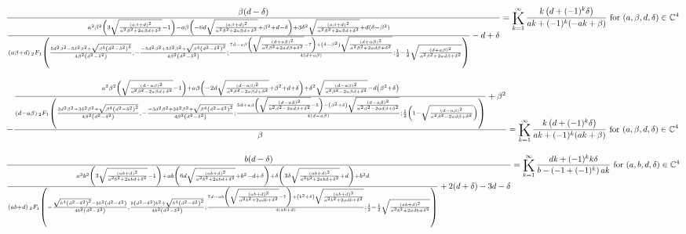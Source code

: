 \documentclass{article}
\newcommand{\bigK}{\mathop{\raisebox{-5pt}{\huge K}}}
\begin{document}
\[\frac{\beta  (d-\delta )}{\frac{a^2 \beta ^2 \left(3 \sqrt{\frac{(a \beta +d)^2}{a^2 \beta ^2+2 a \beta  d+\delta ^2}}-1\right)-a \beta  \left(-6 d \sqrt{\frac{(a \beta +d)^2}{a^2 \beta ^2+2 a \beta  d+\delta ^2}}+\beta ^2+d-\delta \right)+3 \delta ^2 \sqrt{\frac{(a \beta +d)^2}{a^2 \beta ^2+2 a \beta  d+\delta ^2}}+d \left(\delta -\beta ^2\right)}{(a \beta +d) \, _2F_1\left(\frac{5 d^2 \beta ^2-5 \delta ^2 \beta ^2+\sqrt{\beta ^4 \left(d^2-\delta ^2\right)^2}}{4 \beta ^2 \left(d^2-\delta ^2\right)},-\frac{-5 d^2 \beta ^2+5 \delta ^2 \beta ^2+\sqrt{\beta ^4 \left(d^2-\delta ^2\right)^2}}{4 \beta ^2 \left(d^2-\delta ^2\right)};\frac{7 d-a \beta  \left(\sqrt{\frac{(d+a \beta )^2}{a^2 \beta ^2+2 a d \beta +\delta ^2}}-7\right)+\left(\delta -\beta ^2\right) \sqrt{\frac{(d+a \beta )^2}{a^2 \beta ^2+2 a d \beta +\delta ^2}}}{4 (d+a \beta )};\frac{1}{2}-\frac{1}{2} \sqrt{\frac{(d+a \beta )^2}{a^2 \beta ^2+2 a d \beta +\delta ^2}}\right)}-d+\delta }=\bigK_{k=1}^{\infty}\frac{k \left(d+(-1)^k \delta \right)}{a k+(-1)^k (-a k+\beta )}\text{ for }(a,\beta ,d,\delta )\in \mathbb{C}^4\] 

\[-\frac{\frac{a^2 \beta ^2 \left(\sqrt{\frac{(d-a \beta )^2}{a^2 \beta ^2-2 a \beta  d+\delta ^2}}-1\right)+a \beta  \left(-2 d \sqrt{\frac{(d-a \beta )^2}{a^2 \beta ^2-2 a \beta  d+\delta ^2}}+\beta ^2+d+\delta \right)+\delta ^2 \sqrt{\frac{(d-a \beta )^2}{a^2 \beta ^2-2 a \beta  d+\delta ^2}}-d \left(\beta ^2+\delta \right)}{(d-a \beta ) \, _2F_1\left(\frac{3 d^2 \beta ^2-3 \delta ^2 \beta ^2+\sqrt{\beta ^4 \left(d^2-\delta ^2\right)^2}}{4 \beta ^2 \left(d^2-\delta ^2\right)},-\frac{-3 d^2 \beta ^2+3 \delta ^2 \beta ^2+\sqrt{\beta ^4 \left(d^2-\delta ^2\right)^2}}{4 \beta ^2 \left(d^2-\delta ^2\right)};\frac{5 d+a \beta  \left(\sqrt{\frac{(d-a \beta )^2}{a^2 \beta ^2-2 a d \beta +\delta ^2}}-5\right)-\left(\beta ^2+\delta \right) \sqrt{\frac{(d-a \beta )^2}{a^2 \beta ^2-2 a d \beta +\delta ^2}}}{4 (d-a \beta )};\frac{1}{2} \left(1-\sqrt{\frac{(d-a \beta )^2}{a^2 \beta ^2-2 a d \beta +\delta ^2}}\right)\right)}+\beta ^2}{\beta }=\bigK_{k=1}^{\infty}\frac{k \left(d+(-1)^k \delta \right)}{a k+(-1)^k (a k+\beta )}\text{ for }(a,\beta ,d,\delta )\in \mathbb{C}^4\] 

\[\frac{b (d-\delta )}{\frac{a^2 b^2 \left(3 \sqrt{\frac{(a b+d)^2}{a^2 b^2+2 a b d+\delta ^2}}-1\right)+a b \left(6 d \sqrt{\frac{(a b+d)^2}{a^2 b^2+2 a b d+\delta ^2}}+b^2-d+\delta \right)+\delta  \left(3 \delta  \sqrt{\frac{(a b+d)^2}{a^2 b^2+2 a b d+\delta ^2}}+d\right)+b^2 d}{(a b+d) \, _2F_1\left(-\frac{\sqrt{b^4 \left(d^2-\delta ^2\right)^2}-5 b^2 \left(d^2-\delta ^2\right)}{4 b^2 \left(d^2-\delta ^2\right)},\frac{5 \left(d^2-\delta ^2\right) b^2+\sqrt{b^4 \left(d^2-\delta ^2\right)^2}}{4 b^2 \left(d^2-\delta ^2\right)};\frac{7 d-a b \left(\sqrt{\frac{(a b+d)^2}{a^2 b^2+2 a d b+\delta ^2}}-7\right)+\left(b^2+\delta \right) \sqrt{\frac{(a b+d)^2}{a^2 b^2+2 a d b+\delta ^2}}}{4 (a b+d)};\frac{1}{2}-\frac{1}{2} \sqrt{\frac{(a b+d)^2}{a^2 b^2+2 a d b+\delta ^2}}\right)}+2 (d+\delta )-3 d-\delta }=\bigK_{k=1}^{\infty}\frac{d k+(-1)^k k \delta }{b-\left(-1+(-1)^k\right) a k}\text{ for }(a,b,d,\delta )\in \mathbb{C}^4\] 
\end{document}
